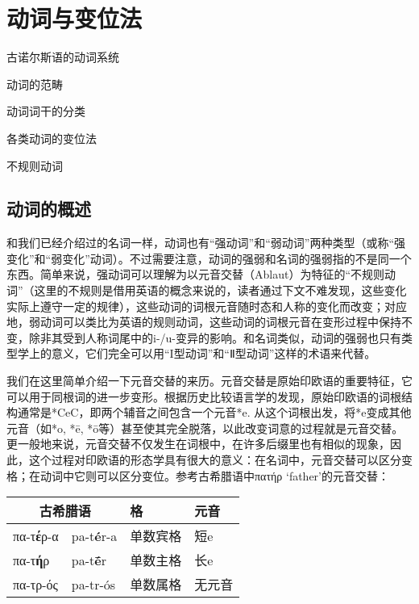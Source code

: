 \chapter{动词与变位法}

\begin{introduction}[章节要点]
    \item 古诺尔斯语的动词系统
    \item 动词的范畴
    \item 动词词干的分类
    \item 各类动词的变位法
    \item 不规则动词
\end{introduction}

\section{动词的概述}\label{sec:verb-intro}
和我们已经介绍过的名词一样，动词也有“强动词”和“弱动词”两种类型（或称“强变化”和“弱变化”动词）。不过需要注意，动词的强弱和名词的强弱指的不是同一个东西。简单来说，强动词可以理解为以元音交替（Ablaut）为特征的“不规则动词”（这里的不规则是借用英语的概念来说的，读者通过下文不难发现，这些变化实际上遵守一定的规律），这些动词的词根元音随时态和人称的变化而改变；对应地，弱动词可以类比为英语的规则动词，这些动词的词根元音在变形过程中保持不变，除非其受到人称词尾中的i-/u-变异的影响。和名词类似，动词的强弱也只有类型学上的意义，它们完全可以用“I型动词”和“Ⅱ型动词”这样的术语来代替。

我们在这里简单介绍一下元音交替的来历。元音交替是原始印欧语的重要特征，它可以用于同根词的进一步变形。根据历史比较语言学的发现，原始印欧语的词根结构通常是*CeC，即两个辅音之间包含一个元音*e. 从这个词根出发，将*e变成其他元音（如*o, *ē, *ō等）甚至使其完全脱落，以此改变词意的过程就是元音交替。更一般地来说，元音交替不仅发生在词根中，在许多后缀里也有相似的现象，因此，这个过程对印欧语的形态学具有很大的意义：在名词中，元音交替可以区分变格；在动词中它则可以区分变位。参考古希腊语中πατήρ `father'的元音交替：

\begin{longtable}{llll}
    \toprule
    \multicolumn{2}{c}{古希腊语} & 格                & 元音              \\
    \midrule
    \endhead
    \bottomrule
    \endfoot
    πα-τ\textbf{έ}ρ-α            & pa-t\textbf{é}r-a & 单数宾格 & 短e    \\
    πα-τ\textbf{ή}ρ              & pa-t\textbf{ḗ}r   & 单数主格 & 长e    \\
    πα-τρ-ός                     & pa-tr-ós          & 单数属格 & 无元音 \\
\end{longtable}

